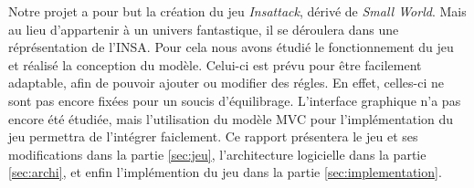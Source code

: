 Notre projet a pour but la création du jeu \emph{Insattack}, dérivé de \emph{Small World}. Mais au lieu d'appartenir à un univers fantastique, il se déroulera dans une réprésentation de l'INSA. Pour cela nous avons étudié le fonctionnement du jeu et réalisé la conception du modèle. Celui-ci est prévu pour être facilement adaptable, afin de pouvoir ajouter ou modifier des régles. En effet, celles-ci ne sont pas encore fixées pour un soucis d'équilibrage.
\medbreak
L'interface graphique n'a pas encore été étudiée, mais l'utilisation du modèle MVC pour l'implémentation du jeu permettra de l'intégrer faiclement.
\medbreak
Ce rapport présentera le jeu et ses modifications dans la partie \ref{sec:jeu}, l'architecture logicielle dans la partie \ref{sec:archi}, et enfin l'implémention du jeu dans la partie \ref{sec:implementation}.  